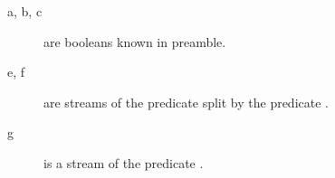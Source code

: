
\begin{description}
  \item[a, b, c] are booleans known in preamble.
  \item[e, f] are streams of the predicate  split by the predicate .
  \item[g] is a stream of the predicate .
\end{description}



